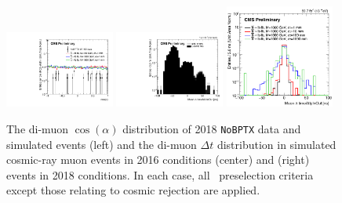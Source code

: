 \begin{figure}
\centering
\includegraphics[width=0.32\textwidth]{figures/selection/mumu_cos_alpha.pdf}
\includegraphics[width=0.32\textwidth]{figures/selection/cosmic_mc_delta_t.pdf}
\includegraphics[width=0.32\textwidth]{figures/selection/signal_mc_delta_t.png}
\caption{The di-muon $\cos{(\alpha)}$ distribution of 2018 \texttt{NoBPTX} data and simulated \stoptolb events (left) and the di-muon $\Delta t$ distribution in simulated cosmic-ray muon events in 2016 conditions (center) and \stoptolb (right) events in 2018 conditions. In each case, all \Pgm\Pgm\ preselection criteria except those relating to cosmic rejection are applied.}
\label{cosmic_cut_distributions}
\end{figure}